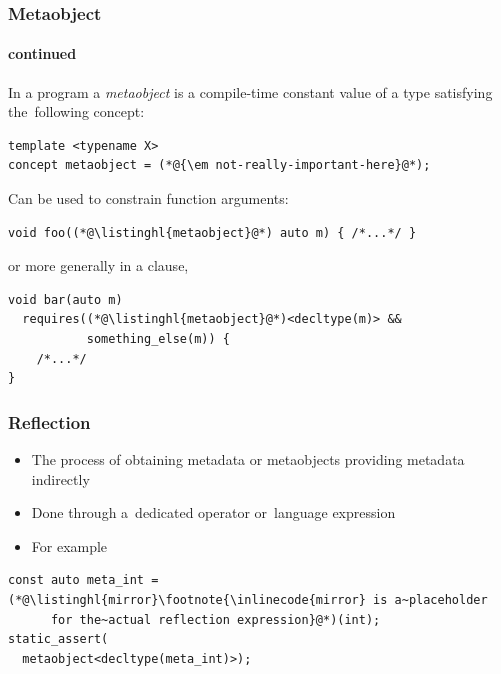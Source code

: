 \documentclass[compress,table,xcolor=table]{beamer}
\begin{document}
\begin{frame}[fragile]
  \frametitle{Metaobject}
  \framesubtitle{continued}
  \larger
  In a program a {\em metaobject} is a compile-time constant
    {\larger value} of a type satisfying the~following concept:
  \begin{lstlisting}[language=c++2x]
template <typename X>
concept metaobject = (*@{\em not-really-important-here}@*);
  \end{lstlisting}
  \vfill
  Can be used to constrain function arguments:
  \begin{lstlisting}[language=c++2x]
void foo((*@\listinghl{metaobject}@*) auto m) { /*...*/ }
  \end{lstlisting}
  or more generally in a  clause,
  \begin{lstlisting}[language=c++2x]
void bar(auto m)
  requires((*@\listinghl{metaobject}@*)<decltype(m)> &&
           something_else(m)) {
    /*...*/
}
  \end{lstlisting}
\end{frame}
\begin{frame}[fragile]
  \frametitle{Reflection}
  \larger
  \begin{itemize}
    \item The process of obtaining metadata or metaobjects providing metadata
      indirectly
    \item Done through a~dedicated operator or~language expression
    \item For example
  \end{itemize}
  \begin{lstlisting}[language=c++2x]
const auto meta_int = (*@\listinghl{mirror}\footnote{\inlinecode{mirror} is a~placeholder
      for the~actual reflection expression}@*)(int);
static_assert(
  metaobject<decltype(meta_int)>);
  \end{lstlisting}
\end{frame}
\end{document}
